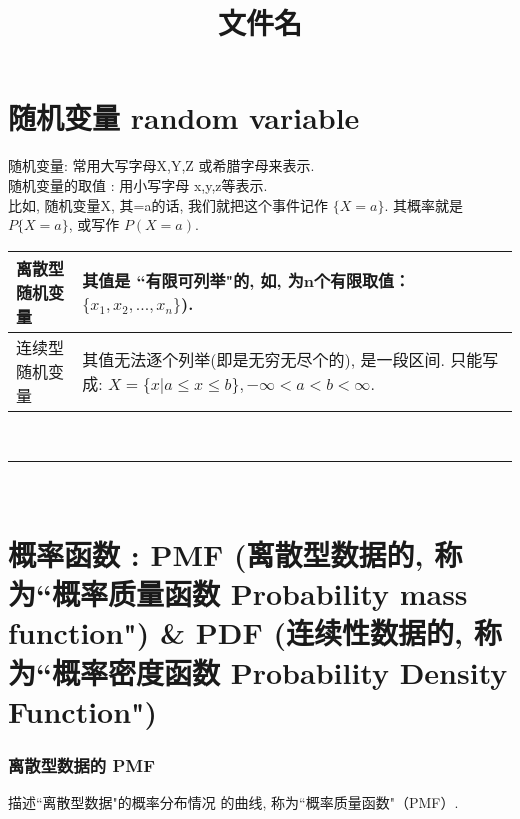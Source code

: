 \documentclass[UTF8]{ctexart}
\title{文件名}
\begin{document}
	\tableofcontents %
	\date{} %
	\maketitle  %
	
		
	


\part{ 随机变量 random variable}
	
	随机变量: 常用大写字母X,Y,Z 或希腊字母来表示. \\
	随机变量的取值 : 用小写字母 x,y,z等表示. \\
	
比如, 随机变量X,  其=a的话, 我们就把这个事件记作 $\{X=a\}$.  其概率就是 $ P\{X=a\}$, 或写作 $P(X=a)$. \\


\begin{tabular}{|p{}|p{}|}
	\hline
	离散型随机变量 &  其值是 ``有限可列举"的, 如, 为n个有限取值：$ \{x_1, x_2, ... , x_n\}$).\\
	\hline
	连续型随机变量 &  \makecell[l]{ 其值无法逐个列举(即是无穷无尽个的), 是一段区间. \\ 只能写成: $X=\{x | a \leq x \leq b\}, -\infty < a < b < \infty $. } \\
	\hline
\end{tabular}





~\\
\hrule
~\\
	
	
\part{概率函数 : PMF (离散型数据的, 称为``概率质量函数 Probability mass function") \& PDF (连续性数据的, 称为``概率密度函数 Probability Density Function")}	




\section{离散型数据的 PMF}

描述``离散型数据"的概率分布情况 的曲线, 称为``概率质量函数"（PMF）. \\
\end{document}

